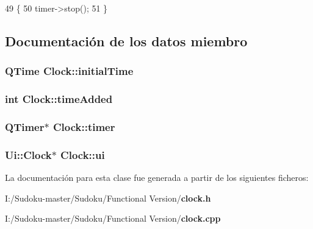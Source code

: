 \begin{DoxyCode}
49 \{
50     timer->stop();
51 \}
\end{DoxyCode}


\subsection{Documentación de los datos miembro}
\subsubsection[{initial\-Time}]{\setlength{\rightskip}{0pt plus 5cm}Q\-Time Clock\-::initial\-Time\hspace{0.3cm}{\ttfamily [private]}}\label{class_clock_ad06c7d67265fe4b6909be8e95e669490}
\subsubsection[{time\-Added}]{\setlength{\rightskip}{0pt plus 5cm}int Clock\-::time\-Added}\label{class_clock_ae2a6285de90ddc3a034d4fd9982e8c24}
\subsubsection[{timer}]{\setlength{\rightskip}{0pt plus 5cm}Q\-Timer$\ast$ Clock\-::timer\hspace{0.3cm}{\ttfamily [private]}}\label{class_clock_ab51e4108c5a6a16e851cad646e77d9ba}
\subsubsection[{ui}]{\setlength{\rightskip}{0pt plus 5cm}Ui\-::\-Clock$\ast$ Clock\-::ui\hspace{0.3cm}{\ttfamily [private]}}\label{class_clock_a60b333971122a727784de3d380642a4d}


La documentación para esta clase fue generada a partir de los siguientes ficheros\-:\begin{DoxyCompactItemize}
\item 
I\-:/\-Sudoku-\/master/\-Sudoku/\-Functional Version/{\bf clock.\-h}\item 
I\-:/\-Sudoku-\/master/\-Sudoku/\-Functional Version/{\bf clock.\-cpp}\end{DoxyCompactItemize}
